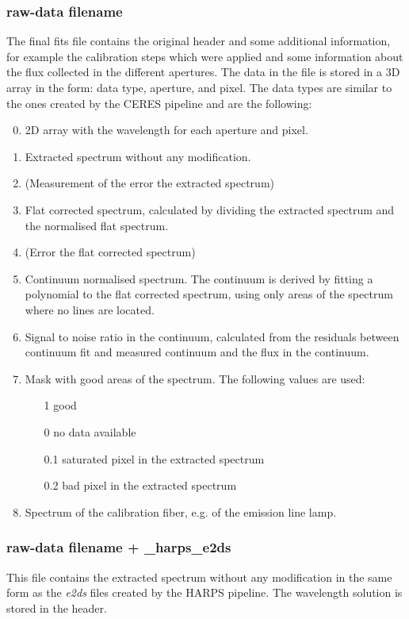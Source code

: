 \documentclass[10pt,a4paper]{article}
\begin{document}
\subsubsection{raw-data filename}
\label{section:extraction_data_format}
The final fits file contains the original header and some additional information, for example the calibration steps which were applied and some information about the flux collected in the different apertures. The data in the file is stored in a 3D array in the form: data type, aperture, and pixel. The data types are similar to the ones created by the CERES pipeline and are the following:
\begin{enumerate}
  \setcounter{enumi}{-1}
  \item 2D array with the wavelength for each aperture and pixel.
  \item Extracted spectrum without any modification.
  \item (Measurement of the error the extracted spectrum)
  \item Flat corrected spectrum, calculated by dividing the extracted spectrum and the normalised flat spectrum.
  \item (Error the flat corrected spectrum)
  \item Continuum normalised spectrum. The continuum is derived by fitting a polynomial to the flat corrected spectrum, using only areas of the spectrum where no lines are located. 
  \item Signal to noise ratio in the continuum, calculated from the residuals between continuum fit and measured continuum and the flux in the continuum.
  \item Mask with good areas of the spectrum. The following values are used:
  \begin{itemize}
    \item[1] good
    \item[0] no data available
    \item[0.1] saturated pixel in the extracted spectrum
    \item[0.2] bad pixel in the extracted spectrum
  \end{itemize}
  \item Spectrum of the calibration fiber, e.g. of the emission line lamp.
\end{enumerate}

\subsubsection{raw-data filename + \_harps\_e2ds}
This file contains the extracted spectrum without any modification in the same form as the \textit{e2ds} files created by the HARPS pipeline. The wavelength solution is stored in the header.
\end{document}
